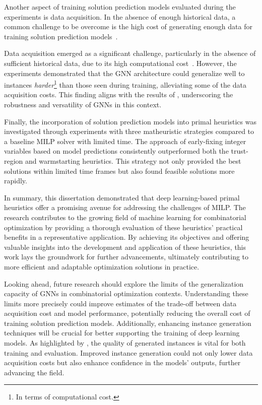 Another aspect of training solution prediction models evaluated during the experiments is data acquisition.
In the absence of enough historical data, a common challenge to be overcome is the high cost of generating enough data for training solution prediction models~\cite{bengioMachineLearningCombinatorial2021,cappartCombinatorialOptimizationReasoning2022,pmlr-v119-yehuda20a}.

Data acquisition emerged as a significant challenge, particularly in the absence of sufficient historical data, due to its high computational cost~\cite{bengioMachineLearningCombinatorial2021,cappartCombinatorialOptimizationReasoning2022,pmlr-v119-yehuda20a}.
However, the experiments demonstrated that the GNN architecture could generalize well to instances \emph{harder}\footnote{In terms of computational cost.} than those seen during training, alleviating some of the data acquisition costs.
This finding aligns with the results of , underscoring the robustness and versatility of GNNs in this context.

Finally, the incorporation of solution prediction models into primal heuristics was investigated through experiments with three matheuristic strategies compared to a baseline MILP solver with limited time.
The approach of early-fixing integer variables based on model predictions consistently outperformed both the trust-region and warmstarting heuristics.
This strategy not only provided the best solutions within limited time frames but also found feasible solutions more rapidly.

In summary, this dissertation demonstrated that deep learning-based primal heuristics offer a promising avenue for addressing the challenges of MILP.
The research contributes to the growing field of machine learning for combinatorial optimization by providing a thorough evaluation of these heuristics' practical benefits in a representative application.
By achieving its objectives and offering valuable insights into the development and application of these heuristics, this work lays the groundwork for further advancements, ultimately contributing to more efficient and adaptable optimization solutions in practice.

Looking ahead, future research should explore the limits of the generalization capacity of GNNs in combinatorial optimization contexts.
Understanding these limits more precisely could improve estimates of the trade-off between data acquisition cost and model performance, potentially reducing the overall cost of training solution prediction models.
Additionally, enhancing instance generation techniques will be crucial for better supporting the training of deep learning models.
As highlighted by , the quality of generated instances is vital for both training and evaluation.
Improved instance generation could not only lower data acquisition costs but also enhance confidence in the models' outputs, further advancing the field.

